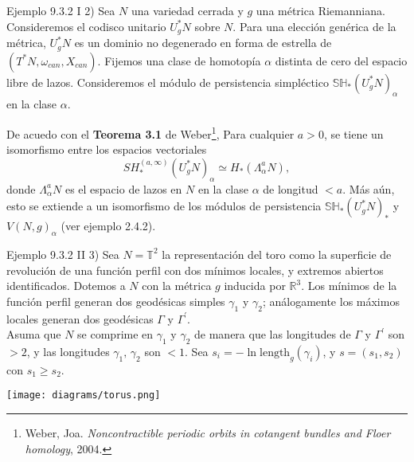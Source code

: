 \documentclass{beamer}
\begin{document}
\begin{frame}{Ejemplo 9.3.2 I}
2) Sea $N$ una variedad cerrada y $g$ una m\'etrica Riemanniana. Consideremos el codisco unitario $U_{g}^{\ast} N$ sobre $N$. Para una elecci\'on gen\'erica de la m\'etrica, $U_{g}^{\ast} N$ es un dominio no degenerado en forma de estrella de $(T^{\ast}N, \omega_{can} , X_{can})$. Fijemos una clase de homotop\'ia $\alpha$ distinta de cero del espacio libre de lazos. Consideremos el m\'odulo de persistencia simpl\'ectico $\mathbb{SH}_{\ast}(U^{\ast}_{g}N)_{\alpha}$ en la clase $\alpha$.
\end{frame}

\begin{frame}
De acuedo con el {\bfseries Teorema 3.1} de Weber\footnote{Weber, Joa. \emph{Noncontractible periodic orbits in cotangent bundles and Floer homology}, 2004.}, Para cualquier $a>0$, se tiene un isomorfismo entre los espacios vectoriales
$$SH_{\ast}^{(a,\infty)}(U_{g}^{\ast}N)_{\alpha}\simeq H_{\ast}(\Lambda_{\alpha}^{a}N), $$
donde $\Lambda_{\alpha}^{a}N$ es el espacio de lazos en $N$ en la clase $\alpha$ de longitud $<a$. M\'as a\'un, esto se extiende a un isomorfismo de los m\'odulos de persistencia $\mathbb{SH}_{\ast}(U_{g}^{\ast}N)_{\ast}$ y $V(N,g)_{\alpha}$ (ver ejemplo 2.4.2).

\end{frame}


\begin{frame}{Ejemplo 9.3.2 II}
3) Sea $N=\mathbb{T}^2$ la representaci\'on del toro como la superficie de revoluci\'on de una funci\'on perfil con dos m\'inimos locales, y extremos abiertos identificados. Dotemos a $N$ con la m\'etrica $g$ inducida por $\mathbb{R}^3$. Los m\'inimos de la funci\'on perfil generan dos geod\'esicas simples $\gamma_1$ y $\gamma_2$; an\'alogamente los m\'aximos locales generan dos geod\'esicas $\Gamma$ y $\Gamma^{\prime}$. \\
\vspace{1em}
Asuma que $N$ se comprime en $\gamma_1$ y $\gamma_2$ de manera que las longitudes de $\Gamma$ y $\Gamma^\prime$ son $>2$, y las longitudes $\gamma_1,\,\gamma_2$ son $<1$. Sea $s_{i}=-\ln \mbox{length}_{g}(\gamma_i)$, y $s=(s_1,s_2)$ con $s_1\geq s_2$.
\begin{center}
\texttt{[image: diagrams/torus.png]}
\end{center}
\end{frame} 
\end{document}
